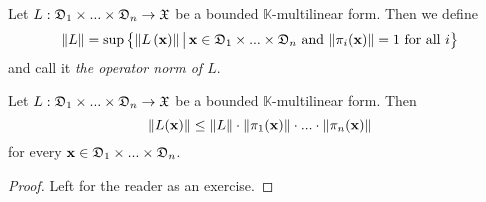 \begin{definition}
Let $L:{\mathfrak D}_1\times ... \times {\mathfrak D}_n\rightarrow {\mathfrak X}$ be a bounded $\mathbb{K}$-multilinear form. Then we define
$$\lVert L\rVert = \sup \big\{\lVert L\left(\mathbf{x}\right)\rVert\,\big|\,\mathbf{x}\in {\mathfrak D}_1\times ...\times {\mathfrak D}_n\mbox{ and }\lVert\pi_i(\mathbf{x})\rVert = 1\mbox{ for all }i \big\}$$
and call it \textit{the operator norm of $L$}.
\end{definition}

\begin{fact}\label{fact:operator_norm_is_lipschitz_constant}
Let $L:{\mathfrak D}_1\times ... \times {\mathfrak D}_n\rightarrow {\mathfrak X}$ be a bounded $\mathbb{K}$-multilinear form. Then
$$\lVert L(\mathbf{x})\rVert \leq \lVert L\rVert\cdot \lVert\pi_1(\mathbf{x})\rVert \cdot ...\cdot \lVert\pi_n(\mathbf{x})\rVert$$
for every $\mathbf{x} \in {\mathfrak D}_1\times ... \times {\mathfrak D}_n$.
\end{fact}
\begin{proof}
Left for the reader as an exercise.
\end{proof}

